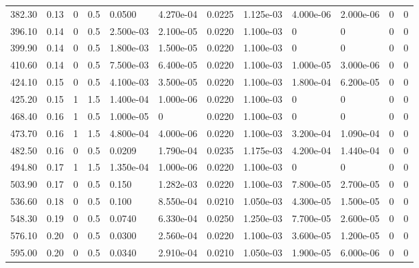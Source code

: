 \documentclass[preview]{standalone}
\begin{document}
{{\begin{tabular}{L{1.2cm}C{1.2cm} C{0.3cm}C{0.5cm} C{1.4cm}C{1.4cm} C{1.4cm}C{1.4cm} C{1.6cm}C{1.6cm} C{1.6cm}C{1.6cm}}
  382.30  &  0.13  & 0     & 0.5 &  0.0500  & 4.270e-04  &  0.0225&   1.125e-03& 4.000e-06 & 2.000e-06   &  0 & 0  \\ 
  396.10  &  0.14  & 0     & 0.5 &  2.500e-03  & 2.100e-05  &  0.0220&   1.100e-03& 0 & 0   &  0 & 0  \\ 
  399.90  &  0.14  & 0     & 0.5 &  1.800e-03  & 1.500e-05  &  0.0220&   1.100e-03& 0 & 0   &  0 & 0  \\ 
  410.60  &  0.14  & 0     & 0.5 &  7.500e-03  & 6.400e-05  &  0.0220&   1.100e-03& 1.000e-05 & 3.000e-06   &  0 & 0  \\ 
  424.10  &  0.15  & 0     & 0.5 &  4.100e-03  & 3.500e-05  &  0.0220&   1.100e-03& 1.800e-04 & 6.200e-05   &  0 & 0  \\ 
  425.20  &  0.15  & 1     & 1.5 &  1.400e-04  & 1.000e-06  &  0.0220&   1.100e-03& 0 & 0   &  0 & 0  \\ 
  468.40  &  0.16  & 1     & 0.5 &  1.000e-05  & 0  &  0.0220&   1.100e-03& 0 & 0   &  0 & 0  \\ 
  473.70  &  0.16  & 1     & 1.5 &  4.800e-04  & 4.000e-06  &  0.0220&   1.100e-03& 3.200e-04 & 1.090e-04   &  0 & 0  \\ 
  482.50  &  0.16  & 0     & 0.5 &  0.0209  & 1.790e-04  &  0.0235&   1.175e-03& 4.200e-04 & 1.440e-04   &  0 & 0  \\ 
  494.80  &  0.17  & 1     & 1.5 &  1.350e-04  & 1.000e-06  &  0.0220&   1.100e-03& 0 & 0   &  0 & 0  \\ 
  503.90  &  0.17  & 0     & 0.5 &  0.150  & 1.282e-03  &  0.0220&   1.100e-03& 7.800e-05 & 2.700e-05   &  0 & 0  \\ 
  536.60  &  0.18  & 0     & 0.5 &  0.100  & 8.550e-04  &  0.0210&   1.050e-03& 4.300e-05 & 1.500e-05   &  0 & 0  \\ 
  548.30  &  0.19  & 0     & 0.5 &  0.0740  & 6.330e-04  &  0.0250&   1.250e-03& 7.700e-05 & 2.600e-05   &  0 & 0  \\ 
  576.10  &  0.20  & 0     & 0.5 &  0.0300  & 2.560e-04  &  0.0220&   1.100e-03& 3.600e-05 & 1.200e-05   &  0 & 0  \\ 
  595.00  &  0.20  & 0     & 0.5 &  0.0340  & 2.910e-04  &  0.0210&   1.050e-03& 1.900e-05 & 6.000e-06   &  0 & 0  \\ 
\hline 
\end{tabular} 

}}
\end{document}
